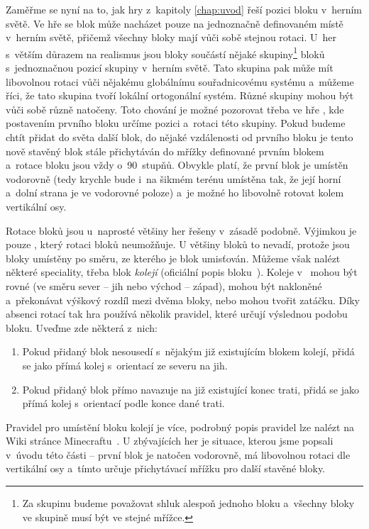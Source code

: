 Zaměřme se nyní na to, jak hry z~kapitoly \ref{chap:uvod} řeší pozici bloku v~herním světě. Ve hře \MC{} se blok může nacházet pouze na jednoznačně definovaném místě v~herním světě, přičemž všechny bloky mají vůči sobě stejnou rotaci. U~her s~větším důrazem na realismus jsou bloky součástí nějaké skupiny\footnote{Za skupinu budeme považovat shluk alespoň jednoho bloku a~všechny bloky ve skupině musí být ve stejné mřížce.} bloků s~jednoznačnou pozicí skupiny v~herním světě. Tato skupina pak může mít libovolnou rotaci vůči nějakému globálnímu souřadnicovému systému a~můžeme říci, že tato skupina tvoří lokální ortogonální systém. Různé skupiny mohou být vůči sobě různě natočeny. Toto chování je možné pozorovat třeba ve hře \ME{}, kde postavením prvního bloku určíme pozici a~rotaci této skupiny. Pokud budeme chtít přidat do světa další blok, do nějaké vzdálenosti od prvního bloku je tento nově stavěný blok stále přichytáván do mřížky definované prvním blokem a~rotace bloku jsou vždy o~90~stupňů. Obvykle platí, že první blok je umístěn vodorovně (tedy krychle bude i~na šikmém terénu umístěna tak, že její horní a~dolní strana je ve vodorovné poloze) a~je možné ho libovolně rotovat kolem vertikální osy.

Rotace bloků jsou u~naprosté většiny her řešeny v~zásadě podobně. Výjimkou je pouze \MC{}, který rotaci bloků neumožňuje. U většiny bloků to nevadí, protože jsou bloky umístěny po směru, ze kterého je blok umisťován. Můžeme však nalézt některé speciality, třeba blok \textit{kolejí} (oficiální popis bloku~\citep{mc_rail}). Koleje v~ mohou být rovné (ve směru sever -- jih nebo východ -- západ), mohou být nakloněné a~překonávat výškový rozdíl mezi dvěma bloky, nebo mohou tvořit zatáčku. Díky absenci rotací tak hra používá několik pravidel, které určují výslednou podobu bloku. Uveďme zde některá z~nich:
\begin{enumerate}
	\item Pokud přidaný blok nesousedí s~nějakým již existujícím blokem kolejí, přidá se jako přímá kolej s~orientací ze severu na jih.
	\item Pokud přidaný blok přímo navazuje na již existující konec trati, přidá se jako přímá kolej s~orientací podle konce dané trati.
\end{enumerate}
 Pravidel pro umístění bloku kolejí je více, podrobný popis pravidel lze nalézt na Wiki stránce Minecraftu~\citep{mc_rail}. U zbývajících her je situace, kterou jsme popsali v~úvodu této části -- první blok je natočen vodorovně, má libovolnou rotaci dle vertikální osy a~tímto určuje přichytávací mřížku pro další stavěné bloky.

